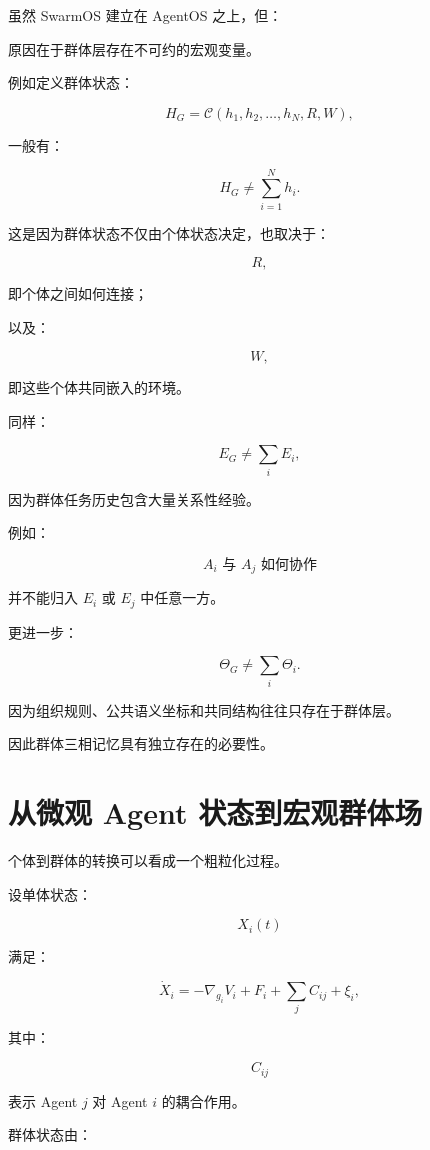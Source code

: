虽然 SwarmOS 建立在 AgentOS 之上，但：

\begin{statementbox}
\centering
{}
\end{statementbox}

原因在于群体层存在不可约的宏观变量。

例如定义群体状态：

\[
H_G
=
\mathcal{C}
\left(
h_1,
h_2,
\dots,
h_N,
R,
W
\right),
\]

一般有：

\[
H_G
\neq
\sum_{i=1}^{N}h_i.
\]

这是因为群体状态不仅由个体状态决定，也取决于：

\[
R,
\]

即个体之间如何连接；

以及：

\[
W,
\]

即这些个体共同嵌入的环境。

同样：

\[
E_G
\neq
\sum_i E_i,
\]

因为群体任务历史包含大量关系性经验。

例如：

\[
A_i
\text{ 与 }
A_j
\text{ 如何协作}
\]

并不能归入 $E_i$ 或 $E_j$ 中任意一方。

更进一步：

\[
\Theta_G
\neq
\sum_i\Theta_i.
\]

因为组织规则、公共语义坐标和共同结构往往只存在于群体层。

因此群体三相记忆具有独立存在的必要性。


\section{从微观 Agent 状态到宏观群体场}

个体到群体的转换可以看成一个粗粒化过程。

设单体状态：

\[
X_i(t)
\]

满足：

\[
\dot X_i
=
-\nabla_{g_i}V_i
+
F_i
+
\sum_j C_{ij}
+
\xi_i,
\]

其中：

\[
C_{ij}
\]

表示 Agent $j$ 对 Agent $i$ 的耦合作用。

群体状态由：

